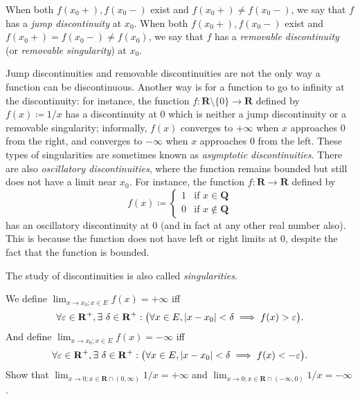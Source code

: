\begin{note}
    When both \(f(x_0+), f(x_0-)\) exist and \(f(x_0+) \neq f(x_0-)\), we say that \(f\) has a \emph{jump discontinuity} at \(x_0\).
    When both \(f(x_0+), f(x_0-)\) exist and \(f(x_0+) = f(x_0-) \neq f(x_0)\), we say that \(f\) has a \emph{removable discontinuity} (or \emph{removable singularity}) at \(x_0\).
\end{note}

\begin{remark}\label{9.5.4}
    Jump discontinuities and removable discontinuities are not the only way a function can be discontinuous.
    Another way is for a function to go to infinity at the discontinuity:
    for instance, the function \(f : \mathbf{R} \setminus \{0\} \to \mathbf{R}\) defined by \(f(x) \coloneqq 1 / x\) has a discontinuity at \(0\) which is neither a jump discontinuity or a removable singularity;
    informally, \(f(x)\) converges to \(+\infty\) when \(x\) approaches \(0\) from the right, and converges to \(-\infty\) when \(x\) approaches \(0\) from the left.
    These types of singularities are sometimes known as \emph{asymptotic discontinuities}.
    There are also \emph{oscillatory discontinuities}, where the function remains bounded but still does not have a limit near \(x_0\).
    For instance, the function \(f : \mathbf{R} \to \mathbf{R}\) defined by
    \[
        f(x) \coloneqq \begin{cases}
            1 & \text{if } x \in \mathbf{Q}    \\
            0 & \text{if } x \notin \mathbf{Q}
        \end{cases}
    \]
    has an oscillatory discontinuity at \(0\) (and in fact at any other real number also).
    This is because the function does not have left or right limits at \(0\), despite the fact that the function is bounded.
\end{remark}

\begin{note}
    The study of discontinuities is also called \emph{singularities}.
\end{note}

\begin{additional corollary}\label{ac 9.5.2}
We define \(\lim_{x \to x_0 ; x \in E} f(x) = +\infty\) iff
\[
    \forall \varepsilon \in \mathbf{R}^+, \exists\ \delta \in \mathbf{R}^+ : \big(\forall x \in E, \abs*{x - x_0} < \delta \implies f(x) > \varepsilon\big).
\]
And define \(\lim_{x \to x_0 ; x \in E} f(x) = -\infty\) iff
\[
    \forall \varepsilon \in \mathbf{R}^+, \exists\ \delta \in \mathbf{R}^+ : \big(\forall x \in E, \abs*{x - x_0} < \delta \implies f(x) < -\varepsilon\big).
\]
Show that \(\lim_{x \to 0 ; x \in \mathbf{R} \cap (0, \infty)} 1 / x = +\infty\) and \(\lim_{x \to 0 ; x \in \mathbf{R} \cap (-\infty, 0)} 1 / x = -\infty\).
\end{additional corollary}

